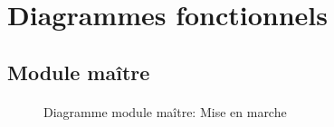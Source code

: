 \section{Diagrammes fonctionnels}
	\paragraph*{}
	\subsection{Module maître}
		\paragraph*{}
		
		\begin{figure}[H]
			\centering
			\caption{Diagramme module maître: Mise en marche}
			\label{fig:diagrammefonctionnelmiseenmarche}
		\end{figure}
		
